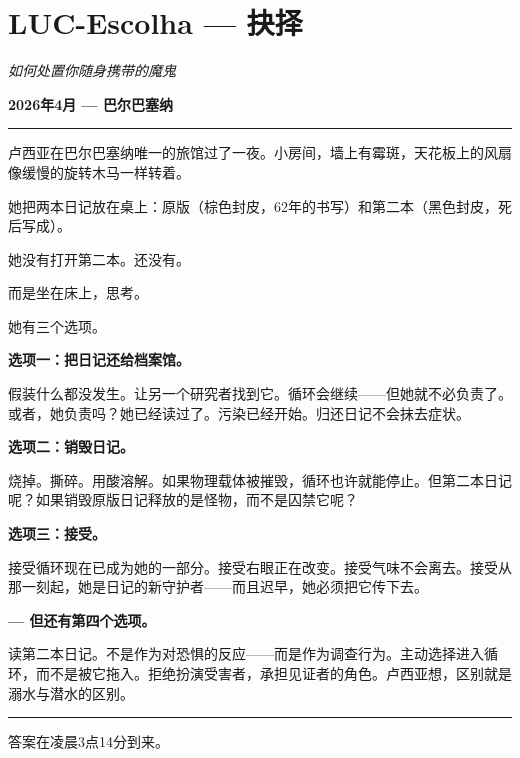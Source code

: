 \section*{\textbf{LUC-Escolha} --- 抉择}

\noindent \textit{如何处置你随身携带的魔鬼}

\noindent \textbf{2026年4月 --- 巴尔巴塞纳}

\vspace{0.5em}\noindent\rule{\textwidth}{0.5pt}\vspace{0.5em}

\noindent 卢西亚在巴尔巴塞纳唯一的旅馆过了一夜。小房间，墙上有霉斑，天花板上的风扇像缓慢的旋转木马一样转着。

\noindent 她把两本日记放在桌上：原版（棕色封皮，62年的书写）和第二本（黑色封皮，死后写成）。

\noindent 她没有打开第二本。还没有。

\noindent 而是坐在床上，思考。

\noindent 她有三个选项。

\noindent \textbf{选项一：把日记还给档案馆。}

\noindent 假装什么都没发生。让另一个研究者找到它。循环会继续——但她就不必负责了。或者，她负责吗？她已经读过了。污染已经开始。归还日记不会抹去症状。

\noindent \textbf{选项二：销毁日记。}

\noindent 烧掉。撕碎。用酸溶解。如果物理载体被摧毁，循环也许就能停止。但第二本日记呢？如果销毁原版日记释放的是怪物，而不是囚禁它呢？

\noindent \textbf{选项三：接受。}

\noindent 接受循环现在已成为她的一部分。接受右眼正在改变。接受气味不会离去。接受从那一刻起，她是日记的新守护者——而且迟早，她必须把它传下去。

\noindent \textbf{--- 但还有第四个选项。}

\noindent 读第二本日记。不是作为对恐惧的反应——而是作为调查行为。主动选择进入循环，而不是被它拖入。拒绝扮演受害者，承担见证者的角色。卢西亚想，区别就是溺水与潜水的区别。

\vspace{0.5em}\noindent\rule{\textwidth}{0.5pt}\vspace{0.5em}

\noindent 答案在凌晨3点14分到来。

